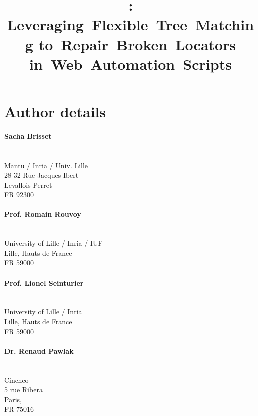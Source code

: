 \documentclass{article}
\title{\erratum: Leveraging~Flexible~Tree~Matching to~Repair~Broken~Locators in~Web~Automation~Scripts}
\date{}
\author{}
\begin{document}
\maketitle

\section*{Author details}

\paragraph{Sacha Brisset}\\
Mantu / Inria / Univ. Lille \\
28-32 Rue Jacques Ibert\\
Levallois-Perret\\
FR 92300

\paragraph{Prof. Romain Rouvoy}\\
University of Lille / Inria / IUF\\
Lille, Hauts de France\\
FR 59000

\paragraph{Prof. Lionel Seinturier}\\
University of Lille / Inria\\
Lille, Hauts de France\\
FR 59000

\paragraph{Dr. Renaud Pawlak}\\
Cincheo\\
5 rue Ribera\\
Paris,\\
FR 75016
\end{document}
